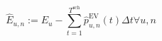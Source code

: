 \begin{equation}
	\hat{E}_{u,n} := E_u - \sum_{t=1}^{T^\text{sch}} \hat{p}^\text{EV}_{u,n}(t)\Delta t \forall u, n
	\label{ch3:equ:temporary-charging-demand}
\end{equation}